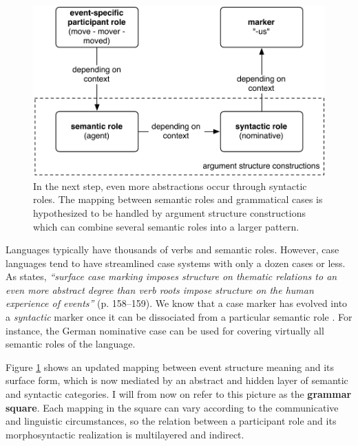 \begin{figure}[t]
\centerline{\includegraphics[scale=0.6]{chap-introduction/figs/case-quadrant}}
  \caption[Formation of case markers: stage IV]{In the next step, even more abstractions occur through syntactic roles. The mapping between semantic roles and grammatical cases is hypothesized to be handled by argument structure constructions which can combine several semantic roles into a larger pattern.}
   \label{f:stage4}
\end{figure}

Languages typically have thousands of verbs and semantic roles. However, case languages tend to have streamlined case systems with only a dozen cases or less. As \citet{croft91syntactic} states, {\em ``surface case marking imposes structure on thematic relations to an even more abstract degree than verb roots impose structure on the human experience of events''} (p. 158--159). We know that a case marker has evolved into a {\em syntactic} marker once it can be dissociated from a particular semantic role \citep[2--3]{givon97introduction}. For instance, the German nominative case can be used for covering virtually all semantic roles of the language. 

Figure \ref{f:stage4} shows an updated mapping between event structure meaning and its surface form, which is now mediated by an abstract and hidden layer of semantic and syntactic categories. I will from now on refer to this picture as the {\bfseries grammar square}. Each mapping in the square can vary according to the communicative and linguistic circumstances, so the relation between a participant role and its morphosyntactic realization is multilayered and indirect.

